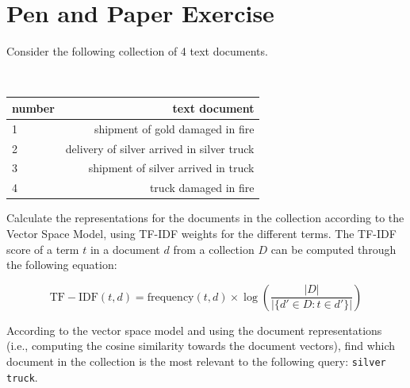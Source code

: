 \documentclass[12pt]{article}
\begin{document}
\section{Pen and Paper Exercise}

Consider the following collection of 4 text documents.

\begin{center}
\tt
\begin{tabular}{ l r }
number & text document \\
\hline
\hline
1 & shipment of gold damaged in fire \\ \hline
2 & delivery of silver arrived in silver truck \\ \hline
3 & shipment of silver arrived in truck \\ \hline
4 & truck damaged in fire \\ \hline
\end{tabular}
\end{center}

Calculate the representations for the documents in the collection according to the Vector Space Model, using TF-IDF weights for the different terms. The TF-IDF score of a term $t$ in a document $d$ from a collection $D$ can be computed through the following equation:

\begin{center}
\begin{equation*}
\mathrm{TF-IDF}(t, d) = \mathrm{frequency}(t,d) \times \log \left( \frac{|D|}{|\{d' \in D: t \in d'\}|} \right)
\end{equation*}
\end{center}

According to the vector space model and using the document representations (i.e., computing the cosine similarity towards the document vectors), find which document in the collection is the most relevant to the following query: {\tt silver truck}. 
\end{document}

